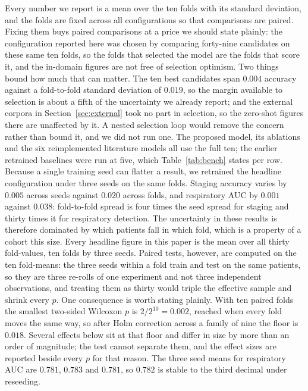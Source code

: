 \documentclass{ieeeaccess}
\newcommand{\mmAuc}{0.782}   %
\begin{document}
Every number we report is a mean over the ten folds with its standard deviation, and the
folds are fixed across all configurations so that comparisons are paired. Fixing them buys
paired comparisons at a price we should state plainly: the configuration reported here was
chosen by comparing forty-nine candidates on these same ten folds, so the folds that
selected the model are the folds that score it, and the in-domain figures are not free of
selection optimism. Two things bound how much that can matter. The ten best candidates span
$0.004$ accuracy against a fold-to-fold standard deviation of $0.019$, so the margin
available to selection is about a fifth of the uncertainty we already report; and the
external corpora in Section~\ref{sec:external} took no part in selection, so the zero-shot
figures there are unaffected by it. A nested selection loop would remove the concern rather
than bound it, and we did not run one. The proposed
model, its ablations and the six reimplemented literature models all use the full ten; the
earlier retrained baselines were run at five, which Table~\ref{tab:bench} states per row. Because a single
training seed can flatter a result, we retrained the headline configuration under three
seeds on the same folds. Staging accuracy varies by $0.005$ across seeds against
$0.020$ across folds, and respiratory AUC by $0.001$ against $0.038$: fold-to-fold spread
is four times the seed spread for staging and thirty times it for respiratory detection.
The uncertainty in these results is therefore dominated by which patients fall in which
fold, which is a property of a cohort this size. Every headline figure in this paper is the mean over all thirty fold-values, ten
folds by three seeds. Paired tests, however, are computed on the ten fold-means: the three
seeds within a fold train and test on the same patients, so they are three re-rolls of one
experiment and not three independent observations, and treating them as thirty would triple
the effective sample and shrink every $p$. One consequence is worth stating plainly. With
ten paired folds the smallest two-sided Wilcoxon $p$ is $2/2^{10}=0.002$, reached when every
fold moves the same way, so after Holm correction across a family of nine the floor is
$0.018$. Several effects below sit at that floor and differ in size by more than an order of
magnitude; the test cannot separate them, and the effect sizes are reported beside every
$p$ for that reason. The three seed means for respiratory AUC are
$0.781$, $0.783$ and $0.781$, so $\mmAuc$ is stable to the third decimal under reseeding.
\end{document}
